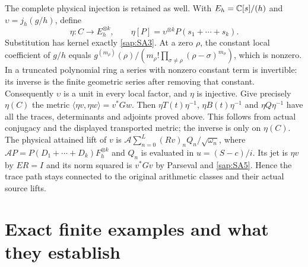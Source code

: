The complete physical injection is retained as well.
With $E_h=\mathbb C[s]/(h)$ and $\upsilon=j_h(g/h)$, define
\begin{equation}\tag{SA37}\label{sap:SA37}
\eta:C\longrightarrow E_h^{\otimes k},\qquad
\eta[P]=\upsilon^{\otimes k}P(s_1+\cdots+s_k).
\end{equation}
Substitution has kernel exactly \eqref{sap:SA3}.
At a zero $\rho$, the constant local coefficient of
$g/h$ equals
$g^{(m_\rho)}(\rho)/
(m_\rho!\prod_{\sigma\ne\rho}(\rho-\sigma)^{m_\sigma})$,
which is nonzero. In a truncated polynomial ring a
series with nonzero constant term is invertible: its
inverse is the finite geometric series after removing
that constant. Consequently $\upsilon$ is a unit in
every local factor, and $\eta$ is injective.
Give precisely $\eta(C)$ the metric
$\langle\eta v,\eta w\rangle=v^*Gw$.
Then $\eta T(t)\eta^{-1}$, $\eta B(t)\eta^{-1}$ and
$\eta Q\eta^{-1}$ have all the traces, determinants
and adjoints proved above. This follows from actual
conjugacy and the displayed transported metric; the
inverse is only on $\eta(C)$.
The physical attained lift of $v$ is
$\mathcal A\sum_{n=0}^L(Rv)_nQ_n/\sqrt{\omega_n}$,
where $\mathcal A P=P(D_1+\cdots+D_k)F_h^{\otimes k}$
and $Q_n$ is evaluated in $u=(S-c)/i$.
Its jet is $\eta v$ by $ER=I$ and its norm squared is
$v^*Gv$ by Parseval and \eqref{sap:SA5}.
Hence the trace path stays connected to the original
arithmetic classes and their actual source lifts.

\section{Exact finite examples and what they establish}

